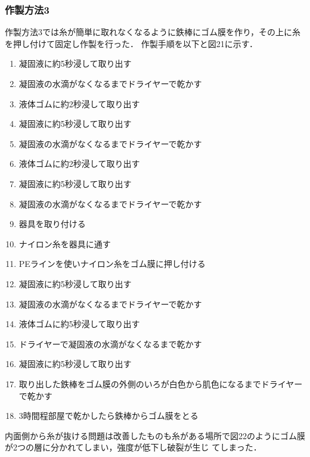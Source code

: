 \subsubsection{作製方法3}
作製方法3では糸が簡単に取れなくなるように鉄棒にゴム膜を作り，その上に糸を押し付けて固定し作製を行った．
作製手順を以下と図21に示す．
\begin{enumerate}
  \item 凝固液に約5秒浸して取り出す
  \item 凝固液の水滴がなくなるまでドライヤーで乾かす
  \item 液体ゴムに約2秒浸して取り出す
  \item 凝固液に約5秒浸して取り出す
  \item 凝固液の水滴がなくなるまでドライヤーで乾かす
  \item 液体ゴムに約2秒浸して取り出す
  \item 凝固液に約5秒浸して取り出す
  \item 凝固液の水滴がなくなるまでドライヤーで乾かす
  \item 器具を取り付ける
  \item ナイロン糸を器具に通す
  \item PEラインを使いナイロン糸をゴム膜に押し付ける
  \item 凝固液に約5秒浸して取り出す
  \item 凝固液の水滴がなくなるまでドライヤーで乾かす
  \item 液体ゴムに約5秒浸して取り出す
  \item ドライヤーで凝固液の水滴がなくなるまで乾かす
  \item 凝固液に約5秒浸して取り出す
  \item 取り出した鉄棒をゴム膜の外側のいろが白色から肌色になるまでドライヤーで乾かす
  \item 3時間程部屋で乾かしたら鉄棒からゴム膜をとる
\end{enumerate}
内面側から糸が抜ける問題は改善したものも糸がある場所で図22のようにゴム膜が2つの層に分かれてしまい，強度が低下し破裂が生じ
てしまった．
